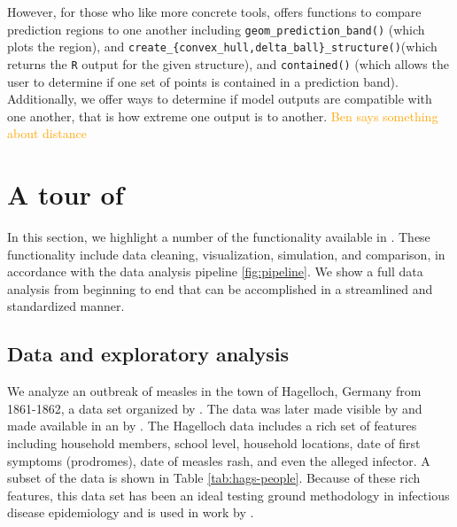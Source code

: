 \documentclass[
  shortnames]{jss}
\begin{document}
However, for those who like more concrete tools,  offers
functions to compare prediction regions to one another including
\texttt{geom\_prediction\_band()} (which plots the region), and
\texttt{create\_\{convex\_hull,delta\_ball\}\_structure()}(which returns
the \texttt{R} output for the given structure), and \texttt{contained()}
(which allows the user to determine if one set of points is contained in
a prediction band). Additionally, we offer ways to determine if model
outputs are compatible with one another, that is how extreme one output
is to another. \textcolor{orange}{Ben says something about distance}

\section[Tour]{A tour of }\label{sec:tour}

In this section, we highlight a number of the functionality available in
. These functionality include data cleaning,
visualization, simulation, and comparison, in accordance with the data
analysis pipeline \ref{fig:pipeline}. We show a full data analysis from
beginning to end that can be accomplished in a streamlined and
standardized manner.

\subsection{Data and exploratory analysis}

We analyze an outbreak of measles in the town of Hagelloch, Germany from
1861-1862, a data set organized by \cite{pfeilsticker1863}. The data was
later made visible by \cite{oesterle1992} and made available in an
 by \cite{surveillance2017}. The Hagelloch data includes a
rich set of features including household members, school level,
household locations, date of first symptoms (prodromes), date of measles
rash, and even the alleged infector. A subset of the data is shown in
Table \ref{tab:hags-people}. Because of these rich features, this data
set has been an ideal testing ground methodology in infectious disease
epidemiology and is used in work by
\cite{Neal2004,britton2011,groendyke2012,becker2016}.
\end{document}
